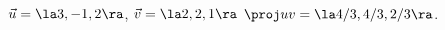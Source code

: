 {$\vec u = \la 3,-1,2\ra$, $\vec v = \la 2,2,1\ra$\label{ex:10_03_ex_24}
}
{$\proj uv = \la 4/3, 4/3, 2/3\ra$.
}
